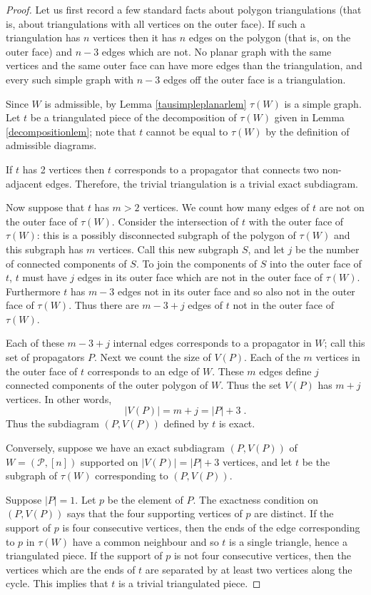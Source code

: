 \documentclass[11pt]{article}
\newcommand{\cP}{\mathcal{P}}
\theoremstyle{remark}
\theoremstyle{definition}
\begin{document}
\begin{proof}
Let us first record a few standard facts about polygon triangulations (that is, about triangulations with all vertices on the outer face).  If such a triangulation has $n$ vertices then it has $n$ edges on the polygon (that is, on the outer face) and $n-3$ edges which are not.  No planar graph with the same vertices and the same outer face can have more edges than the triangulation, and every such simple graph with $n-3$ edges off the outer face is a triangulation.

Since $W$ is admissible, by Lemma \ref{tausimpleplanarlem} $\tau(W)$ is a simple graph. Let $t$ be a triangulated piece of the decomposition of $\tau(W)$ given in Lemma \ref{decompositionlem}; note that $t$ cannot be equal to $\tau(W)$ by the definition of admissible diagrams.

If $t$ has 2 vertices then $t$ corresponds to a propagator that connects two non-adjacent edges. Therefore, the trivial triangulation is a trivial exact subdiagram.

Now suppose that $t$ has $m>2$ vertices.  We count how many edges of $t$ are not on the outer face of $\tau(W)$.  Consider the intersection of $t$ with the outer face of $\tau(W)$: this is a possibly disconnected subgraph of the polygon of $\tau(W)$ and this subgraph has $m$ vertices. Call this new subgraph $S$, and let $j$ be the number of connected components of $S$.   To join the components of $S$ into the outer face of $t$, $t$ must have $j$ edges in its outer face which are not in the outer face of $\tau(W)$.  Furthermore $t$ has $m-3$ edges not in its outer face and so also not in the outer face of $\tau(W)$.  Thus there are $m-3+j$ edges of $t$ not in the outer face of $\tau(W)$.

Each of these $m-3+j$ internal edges corresponds to a propagator in $W$; call this set of propagators $P$.  Next we count the size of $V(P)$.  Each of the $m$ vertices in the outer face of $t$ corresponds to an edge of $W$. These $m$ edges define $j$ connected components of the outer polygon of $W$. Thus the set $V(P)$ has $m+j$ vertices.  In other words, 
\[|V(P)| = m+j = |P| +3\;.\]
Thus the subdiagram $(P,V(P))$ defined by $t$ is exact.


Conversely, suppose we have an exact subdiagram $(P, V(P))$ of $W = (\cP, [n])$ supported on $|V(P)| = |P|+3$ vertices, and let $t$ be the subgraph of $\tau(W)$ corresponding to $(P,V(P))$.

Suppose $|P|=1$. Let $p$ be the element of $P$. The exactness condition on $(P, V(P))$ says that the four supporting vertices of $p$ are distinct.  If the support of $p$ is four consecutive vertices, then the ends of the edge corresponding to $p$ in $\tau(W)$ have a common neighbour and so $t$ is a single triangle, hence a triangulated piece.  If the support of $p$ is not four consecutive vertices, then the vertices which are the ends of $t$ are separated by at least two vertices along the cycle.  This implies that $t$ is a trivial triangulated piece.


\end{proof}
\end{document}
